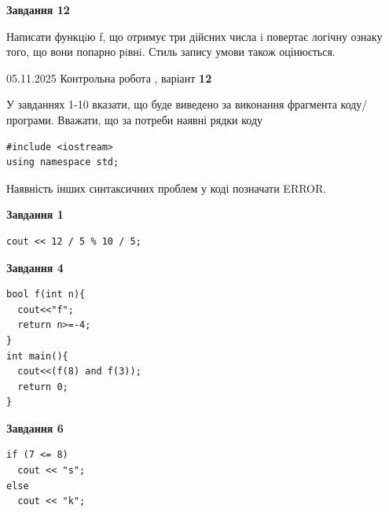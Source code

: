 \documentclass[12pt, ukrainian]{article}
\begin{document}
{\begin {large}
\begin{minipage}[t]{11.0cm}
\begin{center}
\textbf{Завдання 12}
\end{center}

Написати функцiю f, що отримує три дійсних числа i повертає логічну ознаку того, що вони попарно рiвнi. Стиль запису умови також оцінюється.\par

\end{minipage}

\end {large}}
\newpage

{\Large{05.11.2025 Контрольна робота , варіант  \No \textbf { 12 }\par}}
{
\begin {large}
У завданнях 1-10 вказати, що буде виведено за виконання фрагмента коду/про\-гра\-ми.
Вважати, що за потреби наявні рядки коду
\begin{verbatim}
#include <iostream>
using namespace std;
\end{verbatim}
Наявність інших синтаксичних проблем у коді позначати ERROR.

\begin{minipage}[t]{7.0cm}

\begin{center}
\textbf{Завдання 1}
\end{center}
\vspace{-8mm}

\begin{verbatim}
cout << 12 / 5 % 10 / 5;
\end{verbatim}



\begin{center}
\textbf{Завдання 4}
\end{center}
\vspace{-8mm}

\begin{verbatim}
bool f(int n){
  cout<<"f";
  return n>=-4;
}
int main(){
  cout<<(f(8) and f(3));
  return 0;
}
\end{verbatim}



\begin{center}
\textbf{Завдання 6}
\end{center}
\vspace{-8mm}

\begin{verbatim}
if (7 <= 8)
  cout << "s";
else
  cout << "k";
\end{verbatim}




\end{minipage}
\end{large}}
\end{document}
